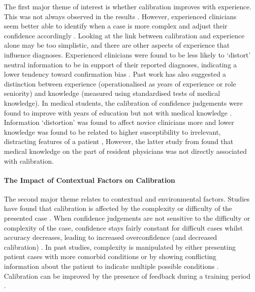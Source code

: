 \documentclass[a4paper, nobind]{templates/ociamthesis}
\begin{document}
The first major theme of interest is whether calibration improves with experience. This was not always observed in the results \autocite{yang_nurses_2010,clayton_are_2023}. However, experienced clinicians seem better able to identify when a case is more complex and adjust their confidence accordingly \autocite{tabak_clinical_1996,brannon_nursing_2003}. Looking at the link between calibration and experience alone may be too simplistic, and there are other aspects of experience that influence diagnoses. Experienced clinicians were found to be less likely to `distort' neutral information to be in support of their reported diagnoses, indicating a lower tendency toward confirmation bias \autocite{kostopoulou_information_2012}. Past work has also suggested a distinction between experience (operationalised as years of experience or role seniority) and knowledge (measured using standardised tests of medical knowledge). In medical students, the calibration of confidence judgements were found to improve with years of education but not with medical knowledge \autocite{hautz_diagnostic_2019}. Information `distortion' was found to affect novice clinicians more \autocite{kostopoulou_information_2012} and lower knowledge was found to be related to higher susceptibility to irrelevant, distracting features of a patient \autocite{mamede_role_2024}, However, the latter study from \textcite{mamede_role_2024} found that medical knowledge on the part of resident physicians was not directly associated with calibration.

\paragraph*{The Impact of Contextual Factors on Calibration}\label{the-impact-of-contextual-factors-on-calibration}

The second major theme relates to contextual and environmental factors. Studies have found that calibration is affected by the complexity or difficulty of the presented case \autocite{meyer_physicians_2013,hausmann_sensitivity_2019,li_relationship_2023}. When confidence judgements are not sensitive to the difficulty or complexity of the case, confidence stays fairly constant for difficult cases whilst accuracy decreases, leading to increased overconfidence (and decreased calibration) \autocite{meyer_physicians_2013}. In past studies, complexity is manipulated by either presenting patient cases with more comorbid conditions \autocite{hausmann_sensitivity_2019} or by showing conflicting information about the patient to indicate multiple possible conditions \autocite{yang_nurses_2010}. Calibration can be improved by the presence of feedback during a training period \autocite{kuhn_improving_2022,staal_impact_2024}.
\end{document}
